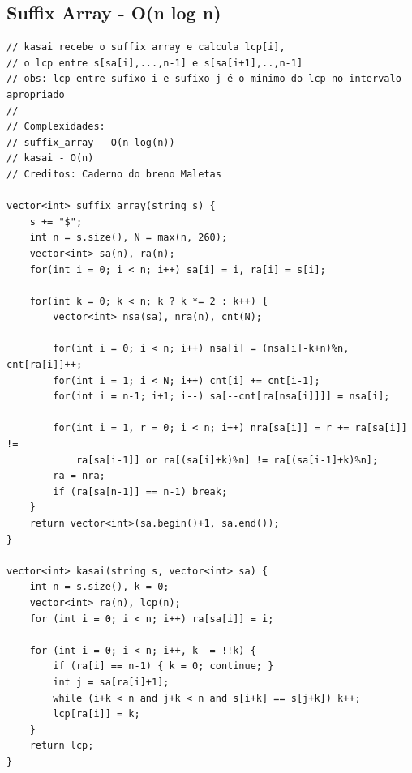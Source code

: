 \documentclass[11pt, a4paper, twoside]{article}
\begin{document}
\subsection{Suffix Array - O(n log n)}
\begin{verbatim}
// kasai recebe o suffix array e calcula lcp[i],
// o lcp entre s[sa[i],...,n-1] e s[sa[i+1],..,n-1]
// obs: lcp entre sufixo i e sufixo j é o minimo do lcp no intervalo apropriado
//
// Complexidades:
// suffix_array - O(n log(n))
// kasai - O(n)
// Creditos: Caderno do breno Maletas

vector<int> suffix_array(string s) {
	s += "$";
	int n = s.size(), N = max(n, 260);
	vector<int> sa(n), ra(n);
	for(int i = 0; i < n; i++) sa[i] = i, ra[i] = s[i];
    
	for(int k = 0; k < n; k ? k *= 2 : k++) {
		vector<int> nsa(sa), nra(n), cnt(N);
    
		for(int i = 0; i < n; i++) nsa[i] = (nsa[i]-k+n)%n, cnt[ra[i]]++;
		for(int i = 1; i < N; i++) cnt[i] += cnt[i-1];
		for(int i = n-1; i+1; i--) sa[--cnt[ra[nsa[i]]]] = nsa[i];
    
		for(int i = 1, r = 0; i < n; i++) nra[sa[i]] = r += ra[sa[i]] !=
			ra[sa[i-1]] or ra[(sa[i]+k)%n] != ra[(sa[i-1]+k)%n];
		ra = nra;
		if (ra[sa[n-1]] == n-1) break;
	}
	return vector<int>(sa.begin()+1, sa.end());
}

vector<int> kasai(string s, vector<int> sa) {
	int n = s.size(), k = 0;
	vector<int> ra(n), lcp(n);
	for (int i = 0; i < n; i++) ra[sa[i]] = i;
    
	for (int i = 0; i < n; i++, k -= !!k) {
		if (ra[i] == n-1) { k = 0; continue; }
		int j = sa[ra[i]+1];
		while (i+k < n and j+k < n and s[i+k] == s[j+k]) k++;
		lcp[ra[i]] = k;
	}
	return lcp;
}
\end{verbatim}
\end{document}
